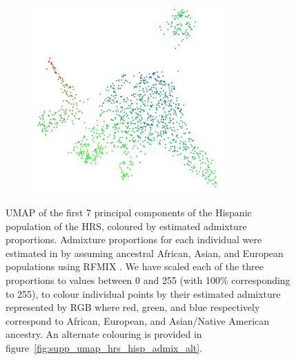 \documentclass[12pt]{pnas-new}
\begin{document}
\begin{figure}
    \centering
    \begin{subfigure}{\textwidth}
    \includegraphics[width=0.8\textwidth]{images/HRS_1000G_NP1_UMAP_PC7_NC2_NN15_MD05_pca_hrshisp_added1kgp_2018115153245_admix.pdf}
    \end{subfigure}
    \caption{UMAP of the first 7 principal components of the Hispanic population of the HRS, coloured by estimated admixture proportions. Admixture proportions for each individual were estimated in \cite{baharian2016great} by assuming ancestral African, Asian, and European populations using RFMIX \cite{Maples:2013fia}. We have scaled each of the three proportions to values between 0 and 255 (with 100\% corresponding to 255), to colour individual points by their estimated admixture represented by RGB where red, green, and blue respectively correspond to African, European, and Asian/Native American ancestry. An alternate colouring is provided in figure~\ref{fig:supp_umap_hrs_hisp_admix_alt}.}
    \label{fig:supp_umap_hrs_hisp_admix}
\end{figure}
\end{document}

